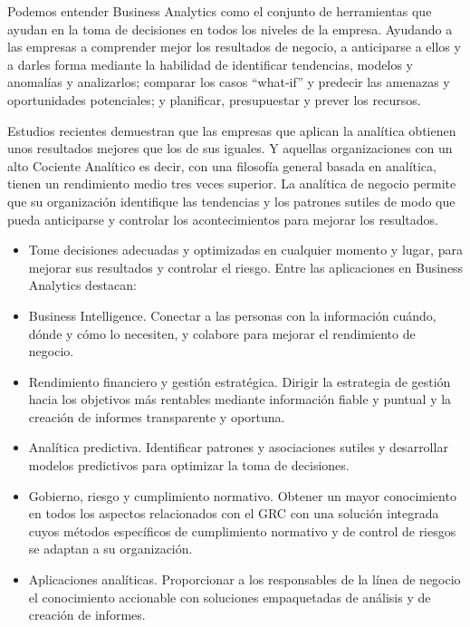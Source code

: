 \documentclass[12pt,a4paper]{report}
\begin{document}
Podemos entender Business Analytics como el conjunto de herramientas que ayudan en la toma de decisiones en todos los niveles de la empresa. Ayudando a las empresas a comprender mejor los resultados de negocio, a anticiparse a ellos y a darles forma mediante la habilidad de identificar tendencias, modelos y anomalías y analizarlos; comparar los casos “what-if” y predecir las amenazas y oportunidades potenciales; y planificar, presupuestar y prever los recursos.

Estudios recientes demuestran que las empresas que aplican la analítica obtienen unos resultados mejores que los de sus iguales. Y aquellas organizaciones con un alto Cociente Analítico es decir, con una filosofía general basada en analítica, tienen un rendimiento medio tres veces superior. La analítica de negocio permite que su organización identifique las tendencias y los patrones sutiles de modo que pueda anticiparse y controlar los acontecimientos para mejorar los resultados.

\begin{itemize}
\item Tome decisiones adecuadas y optimizadas en cualquier momento y lugar, para mejorar sus resultados y controlar el riesgo. Entre las aplicaciones en Business Analytics destacan:
\item  Business Intelligence. Conectar a las personas con la información cuándo, dónde y cómo lo necesiten, y colabore para mejorar el rendimiento de negocio.
\item  Rendimiento financiero y gestión estratégica. Dirigir la estrategia de gestión hacia los objetivos más rentables mediante información fiable y puntual y la creación de informes transparente y oportuna.
\item Analítica predictiva. Identificar patrones y asociaciones sutiles y desarrollar modelos predictivos para optimizar la toma de decisiones.
\item  Gobierno, riesgo y cumplimiento normativo. Obtener un mayor conocimiento en todos los aspectos relacionados con el GRC con una solución integrada cuyos métodos específicos de cumplimiento normativo y de control de riesgos se adaptan a su organización.
\item Aplicaciones analíticas. Proporcionar a los responsables de la línea de negocio el conocimiento accionable con soluciones empaquetadas de análisis y de creación de informes.
\end{itemize}
\end{document}
